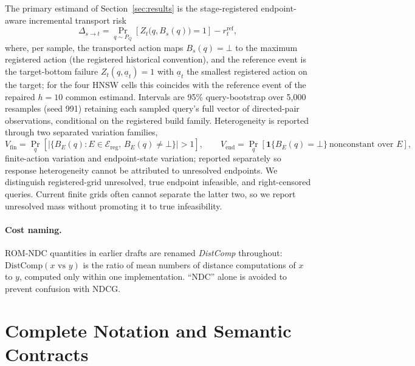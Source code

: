 \documentclass{article}
\newcommand{\DistComp}{\mathrm{DistComp}}
\renewcommand{\Pr}{\mathop{\mathrm{Pr}}}   %
\newcommand{\Ecal}{\mathcal{E}}
\newcommand{\BOT}{\bot}
\begin{document}
The primary estimand of Section~\ref{sec:results} is the stage-registered endpoint-aware incremental
transport risk
\begin{equation}
\Delta_{s\rightarrow t}
=\Pr_{q\sim P_{Q}}\!\left[Z_{t}\big(q,B_{s}(q)\big){=}1\right]-r_{t}^{\mathrm{ref}},
\label{eq:delta}
\end{equation}
where, per sample, the transported action maps $B_s(q){=}\BOT$ to the maximum registered action (the
registered historical convention), and the reference event is the target-bottom failure
$Z_t(q,\underline{a}_t){=}1$ with $\underline{a}_t$ the smallest registered action on the target; for the
four HNSW cells this coincides with the reference event of the repaired $h{=}10$ common estimand. Intervals are 95\%
query-bootstrap over 5{,}000 resamples (seed 991) retaining each sampled query's full vector of directed-pair
observations, conditional on the registered build family. Heterogeneity is reported through two separated
variation families,
\begin{equation}
V_{\mathrm{fin}}=\Pr_{q}\!\left[\big|\{B_{E}(q):E\in\Ecal_{\mathrm{reg}},\,B_{E}(q)\neq\BOT\}\big|>1\right],
\qquad
V_{\mathrm{end}}=\Pr_{q}\!\left[\mathbf{1}\{B_{E}(q){=}\BOT\}\ \text{nonconstant over }E\right],
\label{eq:var}
\end{equation}
finite-action variation and endpoint-state variation; reported separately so response heterogeneity cannot
be attributed to unresolved endpoints. We distinguish registered-grid unresolved, true endpoint infeasible,
and right-censored queries. Current finite grids often cannot separate the latter two, so we report
unresolved mass without promoting it to true infeasibility.

\paragraph{Cost naming.}
ROM-NDC quantities in earlier drafts are renamed \emph{DistComp} throughout:
$\DistComp(x \text{ vs } y)$ is the ratio of mean numbers of distance computations of $x$ to $y$, computed
only within one implementation. ``NDC'' alone is avoided to prevent confusion with NDCG.



\section{Complete Notation and Semantic Contracts}
\label{app:notation}
\end{document}
